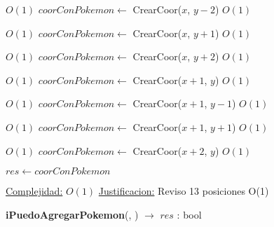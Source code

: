 \begin{Algoritmos}
\begin{algorithmic}[1]
             \Comment $O(1)$
            \State $coorConPokemon \gets$ CrearCoor($x$, $y-2$)    \Comment $O(1)$        
        \EndIf

    \EndIf

\EndIf


         \Comment $O(1)$
        \State $coorConPokemon \gets$ CrearCoor($x$, $y+1$)    \Comment $O(1)$    
    \EndIf


             \Comment $O(1)$
            \State $coorConPokemon \gets$ CrearCoor($x$, $y+2$)    \Comment $O(1)$
        \EndIf


    \EndIf

\EndIf

         \Comment $O(1)$
        \State $coorConPokemon \gets$ CrearCoor($x+1$, $y$)    \Comment $O(1)$
    \EndIf

             \Comment $O(1)$
            \State $coorConPokemon \gets$ CrearCoor($x+1$, $y-1$)    \Comment $O(1)$
        \EndIf
    \EndIf

             \Comment $O(1)$
            \State $coorConPokemon \gets$ CrearCoor($x+1$, $y+1$)    \Comment $O(1)$
        \EndIf

    \EndIf
\EndIf

         \Comment $O(1)$
        \State $coorConPokemon \gets$ CrearCoor($x+2$, $y$)    \Comment $O(1)$
    \EndIf
\EndIf

\State $res \gets coorConPokemon$

\medskip
\State \underline{Complejidad:} $O(1)$ %
\State \underline{Justificacion:} Reviso 13 posiciones O(1)

\end{algorithmic}




\begin{algorithm}[H]
{\textbf{iPuedoAgregarPokemon}(, ) $\to$ $res$ : bool}
\begin{algorithmic}[1]


\end{algorithmic}
\end{algorithm}
\end{Algoritmos}
